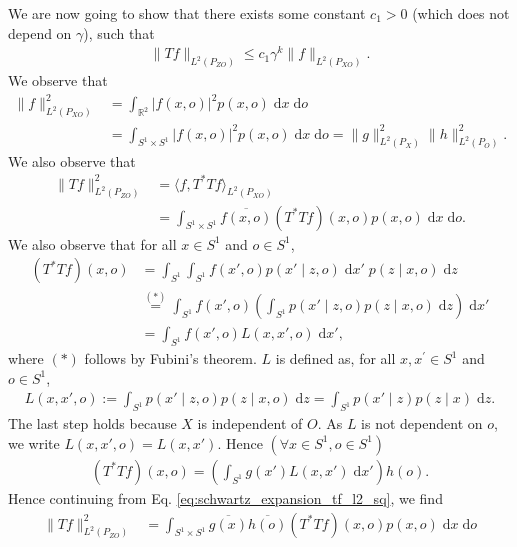\documentclass[11pt]{article}
\newcommand{\0}{\mathbf{0}}
\begin{document}
\begin{appendix}
We are now going to show that there exists some constant $c_1 > 0$ (which does not depend on $\gamma$), such that 
\begin{align*}
    \|Tf\|_{L^2(P_{ZO})}\leq c_1 \gamma^{k}\|f\|_{L^2(P_{XO})}.
\end{align*}
We observe that 
\begin{align}
\label{eq:schwartz_f_g_l2_norm_equiv}
    \|f\|_{L^2(P_{XO})}^2 &= \int_{\mathbb{R}^{2}}|f(x,o)|^2p(x,o)\;\mathrm{d}x\;\mathrm{d}o \nonumber \\
    &= \int_{S^1\times S^1}|f(x,o)|^2p(x,o)\;\mathrm{d}x\;\mathrm{d}o = \|g\|_{L^2(P_{X})}^2\|h\|^2_{L^2(P_{O})}. 
\end{align}
We also observe that 
\begin{align}
    \|Tf\|_{L^2(P_{ZO})}^2 &= \langle f, T^{\ast}Tf\rangle_{L^2(P_{XO})}\nonumber\\
    &= \int_{S^1\times S^1}\overline{f(x,o)}(T^{\ast}Tf)(x,o)p(x,o)\;\mathrm{d}x\;\mathrm{d}o.\label{eq:schwartz_expansion_tf_l2_sq}
\end{align}
We also observe that for all $x \in S^1$ and $o \in S^1$,
\begin{align*}
    (T^{\ast}Tf)(x,o) &= \int_{S^1}\int_{S^1} f(x',o)p(x'\mid z,o) \;\mathrm{d}x'\;p(z\mid x,o)\;\mathrm{d}z\\
    &\stackrel{(\ast)}{=} \int_{S^1}f(x',o)\left(\int_{S^1}p(x'\mid z,o)p(z\mid x,o)\;\mathrm{d}z\right)\;\mathrm{d}x'\\
    &= \int_{S^1}f(x',o)L(x,x',o)\;\mathrm{d}x',
\end{align*}
where $(\ast)$ follows by Fubini's theorem. $L$ is defined as, for all $x, x^\prime \in S^1$ and $o \in S^1$,
\begin{align*}
    L(x,x',o) := \int_{S^1}p(x'\mid z,o)p(z\mid x,o)\;\mathrm{d}z = \int_{S^1}p(x'\mid z)p(z\mid x)\;\mathrm{d}z.
\end{align*}
The last step holds because $X$ is independent of $O$. 
As $L$ is not dependent on $o$, we write $L(x,x',o) = L(x,x')$. Hence $(\forall x\in S^1,o \in S^{1})$
\begin{align*}
    (T^{\ast}Tf)(x,o) = \left(\int_{S^1}g(x')L(x,x')\;\mathrm{d}x'\right)h(o).
\end{align*}
Hence continuing from Eq. \eqref{eq:schwartz_expansion_tf_l2_sq}, we find
\begin{align}
    \|Tf\|_{L^2(P_{ZO})}^2 &= \int_{S^1\times S^1}\overline{g(x)}\overline{h(o)}(T^{\ast}Tf)(x,o)p(x,o)\;\mathrm{d}x\;\mathrm{d}o\nonumber\\

\end{align}
\end{appendix}
\end{document}
